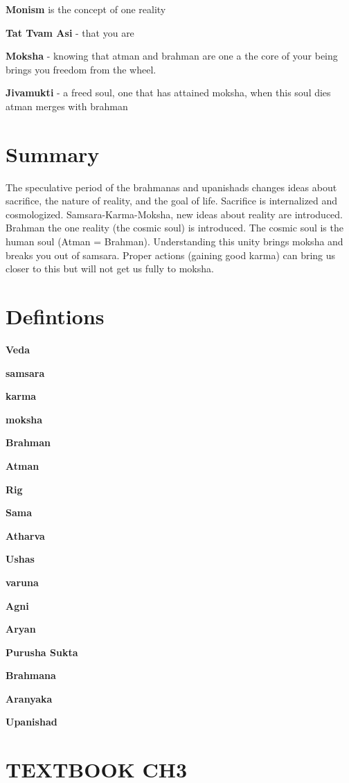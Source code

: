 \documentclass{article}
\begin{document}
\textbf{Monism} is the concept of one reality

\textbf{Tat Tvam Asi} - that you are

\textbf{Moksha} - knowing that atman and brahman are one a the core of your being brings you freedom from the wheel.

\textbf{Jivamukti} - a freed soul, one that has attained moksha, when this soul dies atman merges with brahman

\section*{Summary}
\label{sec:summary}
The speculative period of the brahmanas and upanishads changes ideas about sacrifice, the nature of reality, and the goal of life. Sacrifice is internalized and cosmologized. Samsara-Karma-Moksha, new ideas about reality are introduced. Brahman the one reality (the cosmic soul) is introduced. The cosmic soul is the human soul (Atman = Brahman). Understanding this unity brings moksha and breaks you out of samsara. Proper actions (gaining good karma) can bring us closer to this but will not get us fully to moksha.

\section*{Defintions}
\label{sec:defintions}
\textbf{Veda}

\textbf{samsara}

\textbf{karma}

\textbf{moksha}

\textbf{Brahman}

\textbf{Atman}

\textbf{Rig}

\textbf{Sama}

\textbf{Atharva}

\textbf{Ushas}

\textbf{varuna}

\textbf{Agni}

\textbf{Aryan}

\textbf{Purusha Sukta}

\textbf{Brahmana}

\textbf{Aranyaka}

\textbf{Upanishad}

\section*{TEXTBOOK CH3}
\label{sec:textbook_ch3}
\end{document}
